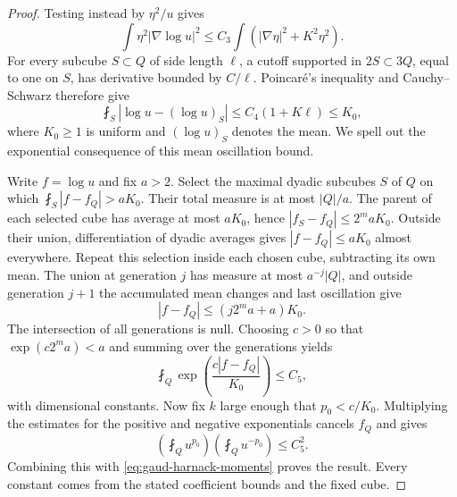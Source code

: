 \begin{proof}
Testing instead by $\eta^2/u$ gives
\[
 \int\eta^2|\nabla\log u|^2
       \leq C_3\int(|\nabla\eta|^2+K^2\eta^2).
\]
For every subcube $S\subset Q$ of side length $\ell$, a cutoff supported in $2S\subset3Q$, equal to one on $S$, has derivative bounded by $C/\ell$. Poincar\'e's inequality and Cauchy--Schwarz therefore give
\[
 \fint_S|\log u-(\log u)_S|
 \leq C_4(1+K\ell)\leq K_0,
\]
where $K_0\geq1$ is uniform and $(\log u)_S$ denotes the mean. We spell out the exponential consequence of this mean oscillation bound.

Write $f=\log u$ and fix $a>2$. Select the maximal dyadic subcubes $S$ of $Q$ on which $\fint_S|f-f_Q|>aK_0$. Their total measure is at most $|Q|/a$. The parent of each selected cube has average at most $aK_0$, hence $|f_S-f_Q|\leq2^maK_0$. Outside their union, differentiation of dyadic averages gives $|f-f_Q|\leq aK_0$ almost everywhere. Repeat this selection inside each chosen cube, subtracting its own mean. The union at generation $j$ has measure at most $a^{-j}|Q|$, and outside generation $j+1$ the accumulated mean changes and last oscillation give
\[
 |f-f_Q|\leq (j2^ma+a)K_0.
\]
The intersection of all generations is null. Choosing $c>0$ so that $\exp(c2^ma)<a$ and summing over the generations yields
\[
 \fint_Q\exp\!\left(\frac{c|f-f_Q|}{K_0}\right)\leq C_5,
\]
with dimensional constants. Now fix $k$ large enough that $p_0<c/K_0$. Multiplying the estimates for the positive and negative exponentials cancels $f_Q$ and gives
\[
 \left(\fint_Q u^{p_0}\right)
 \left(\fint_Q u^{-p_0}\right)\leq C_5^2.
\]
Combining this with \eqref{eq:gaud-harnack-moments} proves the result. Every constant comes from the stated coefficient bounds and the fixed cube.
\end{proof}

